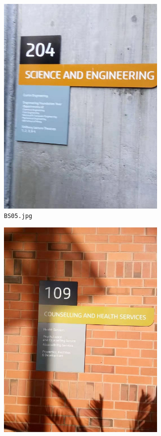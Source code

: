 \documentclass{article}
\begin{document}
\begin{figure}[h]
\begin{subfigure}[h]{0.22\textwidth}
    \includegraphics[width=0.9\textwidth]{../train/task1/BS05}
    \caption[BS05]{
      \lstinline{BS05.jpg}
    }
    \label{fig:bs05}
  \end{subfigure}
  \begin{subfigure}[h]{0.22\textwidth}
    \centering
    \includegraphics[width=0.9\textwidth]{../train/task1/BS07}

\end{subfigure}
\end{figure}
\end{document}
